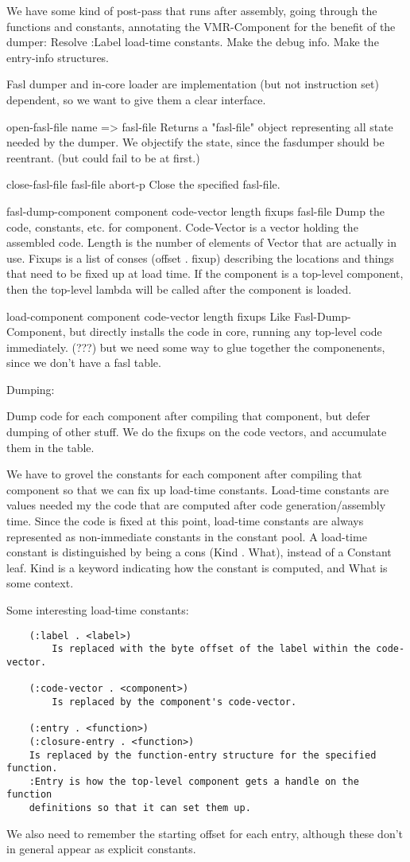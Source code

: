 We have some kind of post-pass that runs after assembly, going through the
functions and constants, annotating the VMR-Component for the benefit of the
dumper:
    Resolve :Label load-time constants.
    Make the debug info.
    Make the entry-info structures.

Fasl dumper and in-core loader are implementation (but not instruction set)
dependent, so we want to give them a clear interface.

open-fasl-file name => fasl-file
    Returns a "fasl-file" object representing all state needed by the dumper.
    We objectify the state, since the fasdumper should be reentrant.  (but
    could fail to be at first.)

close-fasl-file fasl-file abort-p
    Close the specified fasl-file.

fasl-dump-component component code-vector length fixups fasl-file
    Dump the code, constants, etc. for component.  Code-Vector is a vector
    holding the assembled code.  Length is the number of elements of Vector
    that are actually in use.  Fixups is a list of conses (offset . fixup)
    describing the locations and things that need to be fixed up at load time.
    If the component is a top-level component, then the top-level lambda will
    be called after the component is loaded.

load-component component code-vector length fixups
    Like Fasl-Dump-Component, but directly installs the code in core, running
    any top-level code immediately.  (???) but we need some way to glue
    together the componenents, since we don't have a fasl table.



Dumping:

Dump code for each component after compiling that component, but defer dumping
of other stuff.  We do the fixups on the code vectors, and accumulate them in
the table.

We have to grovel the constants for each component after compiling that
component so that we can fix up load-time constants.  Load-time constants are
values needed my the code that are computed after code generation/assembly
time.  Since the code is fixed at this point, load-time constants are always
represented as non-immediate constants in the constant pool.  A load-time
constant is distinguished by being a cons (Kind . What), instead of a Constant
leaf.  Kind is a keyword indicating how the constant is computed, and What is
some context.

Some interesting load-time constants:
\begin{verbatim}
    (:label . <label>)
        Is replaced with the byte offset of the label within the code-vector.

    (:code-vector . <component>)
        Is replaced by the component's code-vector.

    (:entry . <function>)
    (:closure-entry . <function>)
	Is replaced by the function-entry structure for the specified function.
	:Entry is how the top-level component gets a handle on the function
	definitions so that it can set them up.
\end{verbatim}
We also need to remember the starting offset for each entry, although these
don't in general appear as explicit constants.

